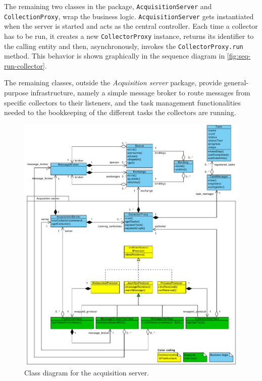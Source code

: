 The remaining two classes in the package, \texttt{AcquisitionServer} and \texttt{CollectionProxy}, wrap the business logic. \texttt{AcquisitionServer} gets instantiated when the server is started and acts as the central controller. Each time a collector has to be run, it creates a new \texttt{CollectorProxy} instance, returns its identifier to the calling entity and then, asynchronously, invokes the \texttt{CollectorProxy.run} method. This behavior is shown graphically in the sequence diagram in \vref{fig:seq-run-collector}.

The remaining classes, outside the \emph{Acquisition server} package, provide general-purpose infrastructure, namely a simple message broker to route messages from specific collectors to their listeners, and the task management functionalities needed to the bookkeeping of the different tasks the collectors are running.

\begin{figure}
  \begin{adjustwidth}{-1mm}{5mm}
    \includegraphics[width=\linewidth]{images/class-collector-server}
  \end{adjustwidth}
  \caption[Class diagram for the acquisition server.]{Class diagram for the acquisition server.}
  \label{fig:class-collector-server}
\end{figure}

